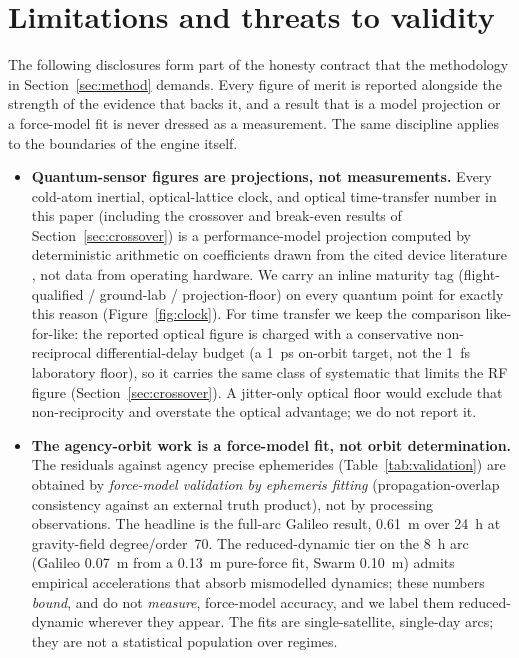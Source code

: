 \section{Limitations and threats to validity}\label{sec:limitations}

The following disclosures form part of the honesty contract that the methodology
in Section~\ref{sec:method} demands. Every figure of merit is reported alongside the
strength of the evidence that backs it, and a result that is a model projection or a
force-model fit is never dressed as a measurement. The same discipline applies to the
boundaries of the engine itself.

\begin{itemize}

  \item \textbf{Quantum-sensor figures are projections, not measurements.}
  Every cold-atom inertial, optical-lattice clock, and optical time-transfer number
  in this paper (including the crossover and break-even results of
  Section~\ref{sec:crossover}) is a performance-model projection computed by
  deterministic arithmetic on coefficients drawn from the cited device literature
  \citep{templier2022,origlia2015,giorgetta2013,deschenes2016}, not data from
  operating hardware. We carry an inline maturity tag (flight-qualified /
  ground-lab / projection-floor) on every quantum point for exactly this reason
  (Figure~\ref{fig:clock}). For time transfer we keep the comparison like-for-like:
  the reported optical figure is charged with a conservative non-reciprocal
  differential-delay budget (a \SI{1}{\pico\second} on-orbit target, not the
  \SI{1}{\femto\second} laboratory floor), so it carries the same class of systematic
  that limits the RF figure (Section~\ref{sec:crossover}). A jitter-only optical floor
  would exclude that non-reciprocity and overstate the optical advantage; we do not
  report it.

  \item \textbf{The agency-orbit work is a force-model fit, not orbit
  determination.} The residuals against agency precise ephemerides
  (Table~\ref{tab:validation}) are obtained by \emph{force-model validation by ephemeris
  fitting} (propagation-overlap consistency against an external truth product), not by
  processing observations. The headline is the full-arc Galileo result,
  \SI{0.61}{\metre} over \SI{24}{\hour} at gravity-field degree/order~70. The
  reduced-dynamic tier on the \SI{8}{\hour} arc (Galileo \SI{0.07}{\metre} from a
  \SI{0.13}{\metre} pure-force fit, Swarm \SI{0.10}{\metre}) admits
  empirical accelerations that absorb mismodelled dynamics; these numbers
  \emph{bound}, and do not \emph{measure}, force-model accuracy, and we label them
  reduced-dynamic wherever they appear. The fits are single-satellite, single-day
  arcs; they are not a statistical population over regimes.


\end{itemize}
